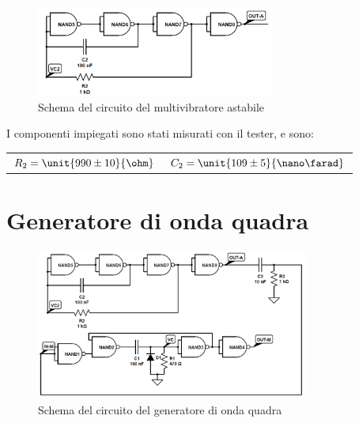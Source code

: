 \documentclass[a4paper,10pt]{article}
\begin{document}
\begin{figure}[H]
	\centering
	\includegraphics[width=0.7\textwidth]{../grafici/Astabile.png}
	\caption{Schema del circuito del multivibratore astabile}
	\label{fig:AST}
\end{figure}

I componenti impiegati sono stati misurati con il tester, e sono:

\begin{table}[H]
	\centering
	\begin{tabular}{cc}
		$R_2 = \unit{990 \pm 10}{\ohm}$ & $C_2 = \unit{109 \pm 5}{\nano\farad}$\\
	\end{tabular}
\end{table}


\section{Generatore di onda quadra}

\begin{figure}[H]
	\centering
	\includegraphics[width=0.8\textwidth]{../grafici/SqGen.png}
	\caption{Schema del circuito del generatore di onda quadra}
	\label{fig:SQGEN}
\end{figure}
\end{document}
